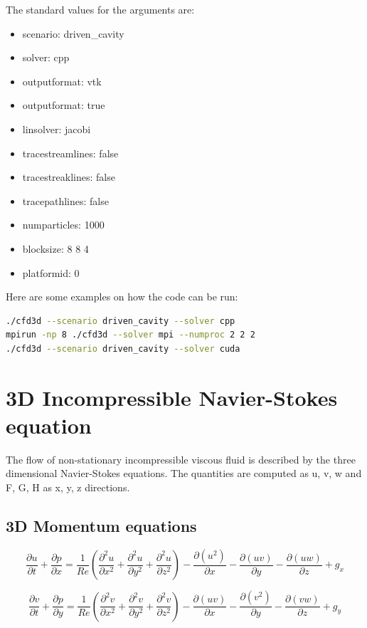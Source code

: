 \documentclass{article}%
\begin{document}
\noindent The standard values for the arguments are:
\begin{itemize}
\item scenario: driven\_cavity
\item solver: cpp
\item outputformat: vtk
\item outputformat: true
\item linsolver: jacobi
\item tracestreamlines: false
\item tracestreaklines: false
\item tracepathlines: false
\item numparticles: 1000
\item blocksize: 8 8 4
\item platformid: 0
\end{itemize}

Here are some examples on how the code can be run:
\begin{lstlisting}[language=bash, frame=single]
./cfd3d --scenario driven_cavity --solver cpp
mpirun -np 8 ./cfd3d --solver mpi --numproc 2 2 2
./cfd3d --scenario driven_cavity --solver cuda
\end{lstlisting}





\section{3D Incompressible Navier-Stokes equation}
The flow of non-stationary incompressible viscous fluid is described by the three dimensional Navier-Stokes equations. The quantities are computed as u, v, w and F, G, H as x, y, z directions.

\subsection{3D Momentum equations}
\begin{equation}
\frac{\partial u}{\partial t} + \frac{\partial p}{\partial x} = 
\frac{1}{Re} \left( \frac{\partial^2 u}{\partial x^2} + \frac{\partial^2 u}{\partial y^2} + \frac{\partial^2 u}{\partial z^2} \right) - 
\frac{\partial(u^2)}{\partial x} -\frac{\partial (uv)}{\partial y} - 
\frac{\partial (uw)}{\partial z} +
g_x 
\end{equation}

\begin{equation}
\frac{\partial v}{\partial t} + \frac{\partial p}{\partial y} = 
\frac{1}{Re} \left( \frac{\partial^2 v}{\partial x^2} + \frac{\partial^2 v}{\partial y^2} + \frac{\partial^2 v}{\partial z^2} \right) - 
\frac{\partial(uv)}{\partial x} -\frac{\partial (v^2)}{\partial y} - 
\frac{\partial (vw)}{\partial z} +
g_y
\end{equation}
\end{document}
